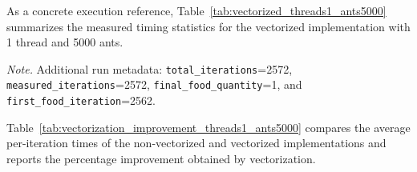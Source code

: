 As a concrete execution reference, Table~\ref{tab:vectorized_threads1_ants5000} summarizes the measured timing statistics for the vectorized implementation with 1 thread and 5000 ants.

\begin{table}[!htbp]
\centering
\caption{Measured timing statistics for the vectorized implementation with 1 thread and 5000 ants.}
\label{tab:vectorized_threads1_ants5000}
\scriptsize
\setlength{\tabcolsep}{2.8pt}
\renewcommand{\arraystretch}{1.08}
\par\vspace{2pt}\parbox{\columnwidth}{\raggedright\footnotesize\textit{Note.} Additional run metadata: \texttt{total\_iterations}=2572, \texttt{measured\_iterations}=2572, \texttt{final\_food\_quantity}=1, and \texttt{first\_food\_iteration}=2562.}
\end{table}

Table~\ref{tab:vectorization_improvement_threads1_ants5000} compares the average per-iteration times of the non-vectorized and vectorized implementations and reports the percentage improvement obtained by vectorization.

